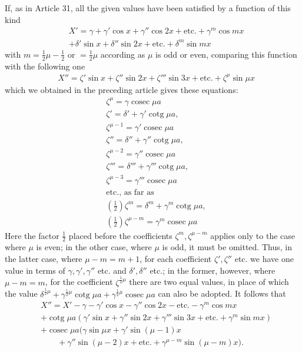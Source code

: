 If, as in Article 31, all the given values have been satisfied by a function of this kind
\[
\begin{aligned}
&X'={}\gamma+\gamma'\cos x+\gamma''\cos 2x+\text{etc.}+\gamma^{m}\cos mx\\[5pt]
&+\delta'\sin x+\delta''\sin 2x+\text{etc.}+\delta^{m}\sin mx
\end{aligned}
\]
with $m=\tfrac{1}{2}\mu-\tfrac{1}{2}$ or $=\tfrac{1}{2}\mu$ according as $\mu$ is odd or even, comparing this function with the following one
\[
\begin{aligned}
&X''=\zeta'\sin x+\zeta''\sin 2x+\zeta'''\sin 3x+\text{etc.}+\zeta^{\mu}\sin\mu x
\end{aligned}
\]
which we obtained in the preceding article gives these equations:
\[
\begin{aligned}
&\zeta^{\mu}=\gamma\operatorname{cosec}\mu a\\[5pt]
&\zeta'=\delta'+\gamma'\operatorname{cotg}\mu a,\\[5pt]
&\zeta^{\mu-1}=\gamma'\operatorname{cosec}\mu a\\[5pt]
&\zeta''=\delta''+\gamma''\operatorname{cotg}\mu a,\\[5pt]
&\zeta^{\mu-2}=\gamma''\operatorname{cosec}\mu a\\[5pt]
&\zeta'''=\delta'''+\gamma'''\operatorname{cotg}\mu a,\\[5pt]
&\zeta^{\mu-3}=\gamma'''\operatorname{cosec}\mu a\\[5pt]
&\text{etc., as far as}\\[5pt]
&(\tfrac{1}{2})\zeta^{m}=\delta^{m}+\gamma^{m}\operatorname{cotg}\mu a,\\[5pt]
&(\tfrac{1}{2})\zeta^{\mu-m}=\gamma^{m}\operatorname{cosec}\mu a
\end{aligned}
\]
Here the factor $\tfrac{1}{2}$ placed before the coefficients $\zeta^{m},\zeta^{\mu-m}$ applies only to the case where $\mu$ is even; in the other case, where $\mu$ is odd, it must be omitted. Thus, in the latter case, where $\mu-m=m+1$, for each coefficient $\zeta',\zeta''$ etc. we have one value in terms of $\gamma,\gamma',\gamma''$ etc. and $\delta',\delta''$ etc.; in the former, however, where $\mu-m=m$, for the coefficient $\zeta^{\frac{1}{2}\mu}$ there are two equal values, in place of which the value $\delta^{\frac{1}{2}\mu}+\gamma^{\frac{1}{2}\mu}\operatorname{cotg}\mu a+\gamma^{\frac{1}{2}\mu}\operatorname{cosec}\mu a$ can also be adopted. It follows that
\[
\begin{aligned}
&X''={}X'-\gamma-\gamma'\cos x-\gamma''\cos 2x-\text{etc.}-\gamma^{m}\cos mx\\[5pt]
&+\operatorname{cotg}\mu a(\gamma'\sin x+\gamma''\sin 2x+\gamma'''\sin 3x+\text{etc.}+\gamma^{m}\sin mx)\\[5pt]
&+\operatorname{cosec}\mu a(\gamma\sin\mu x+\gamma'\sin(\mu-1)x\\[5pt]
&\qquad{}+\gamma''\sin(\mu-2)x+\text{etc.}+\gamma^{\mu-m}\sin(\mu-m)x).
\end{aligned}
\]
